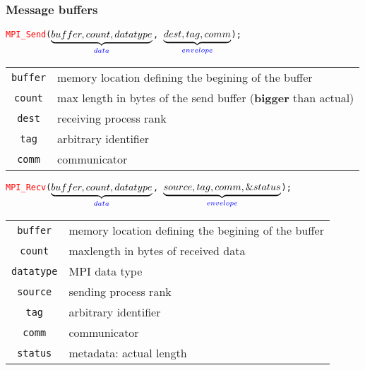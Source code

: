 \begin{frame}
\frametitle{Message buffers}

\begin{center}
\texttt{\textcolor{red}{MPI\_Send}($\underbrace{buffer, count, datatype}_{\textcolor{blue}{data}}$,
    $\underbrace{dest, tag, comm}_{\textcolor{blue}{envelope}}$); }
\end{center}

\begin{tabular}{|c|l|}
\hline
\texttt{buffer}    & memory location defining the begining of the buffer\\
\texttt{count}     & max length in bytes of the send buffer (\textbf{bigger} than actual)\\
\texttt{dest} & receiving process rank\\
\texttt{tag}        & arbitrary identifier \\
\texttt{comm}        & communicator \\
\hline
\end{tabular}

\begin{center}
\texttt{\textcolor{red}{MPI\_Recv}($\underbrace{buffer, count, datatype}_{\textcolor{blue}{data}}$,
    $\underbrace{source, tag, comm,\&status}_{\textcolor{blue}{envelope}}$); }
\end{center}

\begin{tabular}{|c|l|}
\hline
\texttt{buffer}    & memory location defining the begining of the buffer\\
\texttt{count}  & maxlength in bytes of received data\\
\texttt{datatype}  & MPI data type\\
\texttt{source}& sending process rank\\
\texttt{tag}        & arbitrary identifier \\
\texttt{comm}        & communicator \\
\texttt{status}     & metadata: actual length \\
\hline
\end{tabular}

\end{frame}

